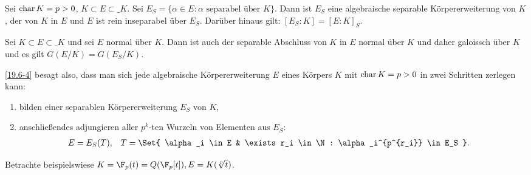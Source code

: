 \begin{st} \label{19.6-4}
	Sei $\operatorname{char} K = p > 0$, $K \subset E \subset \_K$.
	Sei $E_S = \{ \alpha \in E : \text{\(\alpha\) separabel über \(K\)} \}$.
	Dann ist $E_S$ eine algebraische separable Körpererweiterung von $K$, der  von $K$ in $E$ und $E$ ist rein inseparabel über $E_S$.
	Darüber hinaus gilt: $[E_S : K] = [E : K]_S$.
\end{st}

\begin{st} \label{19.6-5}
	Sei $K \subset E \subset \_K$ und sei $E$ normal über $K$.
	Dann ist auch der separable Abschluss von $K$ in $E$ normal über $K$ und daher galoissch über $K$ und es gilt $G(E / K) = G(E_S / K)$.
\end{st}

\begin{nt} \label{19.6-6}
	\ref{19.6-4} besagt also, dass man sich jede algebraische Körpererweiterung $E$ eines Körpers $K$ mit $\operatorname{char} K = p > 0$ in zwei Schritten zerlegen kann:
	\begin{enumerate}[1.]
		\item
			bilden einer separablen Körpererweiterung $E_S$ von $K$,
		\item
			anschließendes adjungieren aller $p^k$-ten Wurzeln von Elementen aus $E_S$:
			\begin{align*}
				E &= E_S(T),&
				T &= \Set{ \alpha_i \in E & \exists r_i \in \N : \alpha_i^{p^{r_i}} \in E_S }.
			\end{align*}
	\end{enumerate}
	Betrachte beispielswiese $K = \F_p(t) = Q(\F_p[t]), E = K(\sqrt[p]{t})$.
\end{nt}





